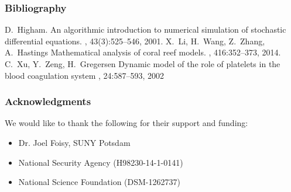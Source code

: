 
\begin{frame}
  \frametitle{Bibliography}

 \begin{thebibliography}{1}

   D.~Higham.
   \newblock An algorithmic introduction to numerical simulation of stochastic
   differential equations.
   , 43(3):525--546, 2001.
   X.~Li, H.~Wang, Z.~Zhang, A.~Hastings
   \newblock Mathematical analysis of coral reef models.
   , 416:352--373, 2014.
   C.~Xu, Y.~Zeng, H.~Gregersen
   \newblock Dynamic model of the role of platelets in the blood coagulation system
   , 24:587--593, 2002

  \end{thebibliography}
  
\end{frame}

\begin{frame}
  \frametitle{Acknowledgments}
  
  We would like to thank the following for their support and funding: 
  
 \begin{itemize}
 \item Dr. Joel Foisy, SUNY Potsdam
 \item National Security Agency (H98230-14-1-0141)
 \item National Science Foundation (DSM-1262737)
 \end{itemize}
\end{frame}



